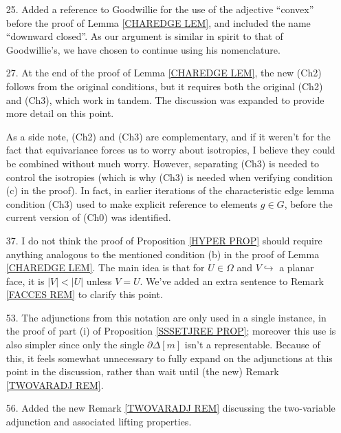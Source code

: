 \documentclass{article}
\begin{document}
\begin{itemize}
\item[25.] Added a reference to Goodwillie for the use of the adjective ``convex'' before the proof of Lemma \ref{CHAREDGE LEM}, and included the name ``downward closed''.
      As our argument is similar in spirit to that of Goodwillie's, we have chosen to continue using his nomenclature. %

      
\item[27.] At the end of the proof of Lemma \ref{CHAREDGE LEM}, the new (Ch2) follows from the original conditions, but it requires both the original (Ch2) and (Ch3), which work in tandem. The discussion was expanded to provide more detail on this point. %
      
      As a side note, (Ch2) and (Ch3) are complementary, and if it weren't for the fact that equivariance forces us to worry about isotropies, I believe they could be combined without much worry.
      However, separating (Ch3) is needed to control the isotropies (which is why (Ch3) is needed when verifying condition (c) in the proof). In fact, in earlier iterations of the characteristic edge lemma condition (Ch3) used to make explicit reference to elements $g \in G$, before the current version of (Ch0) was identified. %
     

\item[37.] I do not think the proof of Proposition \ref{HYPER PROP} should require anything analogous to the mentioned condition (b) in the proof of Lemma \ref{CHAREDGE LEM}.
      The main idea is that for $U \in \Omega$ and $V \hookrightarrow$ a planar face, it is $|V|<|U|$ unless $V=U$. We've added an extra sentence to Remark \ref{FACCES REM} to clarify this point. %
      

\item[53.] The adjunctions from this notation are only used in a single instance, in the proof of part (i) of Proposition \ref{SSSETJREE PROP}; moreover this use is also simpler since only the single $\partial \Delta[m]$ isn't a representable.
      Because of this, it feels somewhat unnecessary to fully expand on the adjunctions at this point in the discussion,
      rather than wait until (the new) Remark \ref{TWOVARADJ REM}. %

\item[56.] Added the new Remark \ref{TWOVARADJ REM} discussing the two-variable adjunction and associated lifting properties. %

      


\end{itemize}
\end{document}
